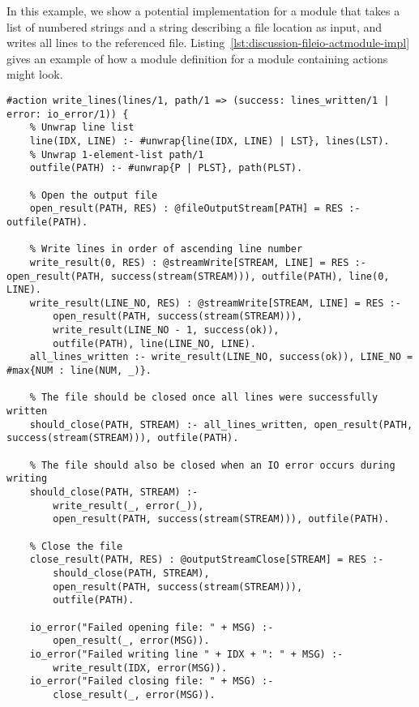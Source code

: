 \begin{example}
\label{ex:discussion-fileio-actmodules}	
In this example, we show a potential implementation for a module that takes a list of numbered strings and a string describing a file location as input, and writes all lines to the referenced file. Listing~\ref{lst:discussion-fileio-actmodule-impl} gives an example of how a module definition for a module containing actions might look.
\begin{lstlisting}[style=asp-code, label={lst:discussion-fileio-actmodule-impl}, caption={Prototypical definition of a module containing Evolog actions.}]
#action write_lines(lines/1, path/1 => (success: lines_written/1 | error: io_error/1)) {
	% Unwrap line list
	line(IDX, LINE) :- #unwrap{line(IDX, LINE) | LST}, lines(LST).
	% Unwrap 1-element-list path/1
	outfile(PATH) :- #unwrap{P | PLST}, path(PLST).
	
	% Open the output file
	open_result(PATH, RES) : @fileOutputStream[PATH] = RES :- outfile(PATH).

	% Write lines in order of ascending line number
	write_result(0, RES) : @streamWrite[STREAM, LINE] = RES :- open_result(PATH, success(stream(STREAM))), outfile(PATH), line(0, LINE).
	write_result(LINE_NO, RES) : @streamWrite[STREAM, LINE] = RES :-  
		open_result(PATH, success(stream(STREAM))), 
		write_result(LINE_NO - 1, success(ok)), 
		outfile(PATH), line(LINE_NO, LINE).
	all_lines_written :- write_result(LINE_NO, success(ok)), LINE_NO = #max{NUM : line(NUM, _)}.
		
	% The file should be closed once all lines were successfully written	
	should_close(PATH, STREAM) :- all_lines_written, open_result(PATH, success(stream(STREAM))), outfile(PATH).

	% The file should also be closed when an IO error occurs during writing
	should_close(PATH, STREAM) :- 
		write_result(_, error(_)),
		open_result(PATH, success(stream(STREAM))), outfile(PATH).

	% Close the file
	close_result(PATH, RES) : @outputStreamClose[STREAM] = RES :- 
		should_close(PATH, STREAM), 
		open_result(PATH, success(stream(STREAM))), 
		outfile(PATH).

	io_error("Failed opening file: " + MSG) :-
		open_result(_, error(MSG)).
	io_error("Failed writing line " + IDX + ": " + MSG) :-
		write_result(IDX, error(MSG)).
	io_error("Failed closing file: " + MSG) :-
		close_result(_, error(MSG)).


\end{lstlisting}
\end{example}
